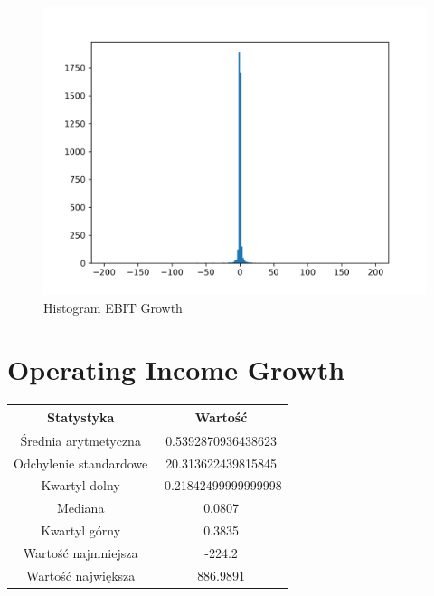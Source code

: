 \documentclass{article}
\begin{document}
\begin{figure}[h!]
    \includegraphics[width=\linewidth]{variables/EBIT Growth.png}
    \caption{Histogram EBIT Growth }
\end{figure}\section{ Operating Income Growth }

\begin{center}
    \begin{tabular}{|c | c|} 
    \hline
    Statystyka & Wartość \\
    \hline\hline
    Średnia arytmetyczna & 0.5392870936438623 \\ 
    \hline
    Odchylenie standardowe & 20.313622439815845 \\
    \hline
    Kwartyl dolny & -0.21842499999999998 \\
    \hline
    Mediana & 0.0807 \\
    \hline
    Kwartyl górny & 0.3835 \\
    \hline
    Wartość najmniejsza & -224.2 \\
    \hline
    Wartość największa & 886.9891 \\
    \hline
   \end{tabular}
\end{center}
\end{document}
